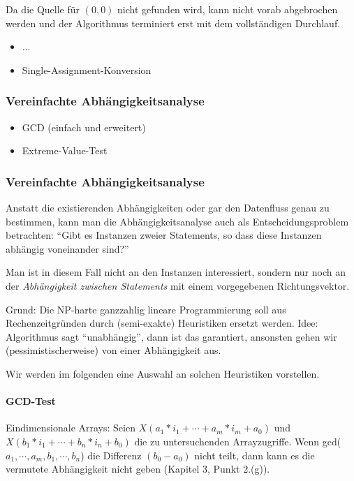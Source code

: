 Da die Quelle für \( (0,0) \) nicht gefunden wird, kann nicht vorab abgebrochen werden und der Algorithmus terminiert erst mit dem vollständigen Durchlauf.
    \begin{itemize}
        \item ...
        \item Single-Assignment-Konversion
    \end{itemize}
\subsubsection{Vereinfachte Abhängigkeitsanalyse}
    \begin{itemize}
        \item GCD (einfach und erweitert)
        \item Extreme-Value-Test
    \end{itemize}

\subsubsection{Vereinfachte Abhängigkeitsanalyse}

Anstatt die existierenden Abhängigkeiten oder gar den Datenfluss genau
zu bestimmen, kann man die Abhängigkeitsanalyse auch als
Entscheidungsproblem betrachten: ``Gibt es Instanzen zweier
Statements, so dass diese Instanzen abhängig voneinander sind?''

Man ist in diesem Fall nicht an den Instanzen interessiert, sondern
nur noch an der \emph{Abhängigkeit zwischen Statements} mit einem
vorgegebenen Richtungsvektor.

Grund: Die NP-harte ganzzahlig lineare Programmierung soll aus
Rechenzeitgründen durch (semi-exakte) Heuristiken ersetzt werden.
Idee: Algorithmus sagt ``unabhängig'', dann ist das garantiert,
ansonsten gehen wir (pessimistischerweise) von einer Abhängigkeit aus.

Wir werden im folgenden eine Auswahl an solchen Heuristiken
vorstellen.


\paragraph{GCD-Test \cite{Ban93}}
Eindimensionale Arrays: Seien $X(a_1*i_1+\cdots+a_m*i_m+a_0)$ und
$X(b_1*i_1+\cdots+b_n*i_n+b_0)$ die zu untersuchenden Arrayzugriffe.
Wenn gcd($a_1,\cdots,a_m,b_1,\cdots,b_n$) die Differenz $(b_0-a_0)$
nicht teilt, dann kann es die vermutete Abhängigkeit nicht geben
(Kapitel 3, Punkt 2.(g)).

